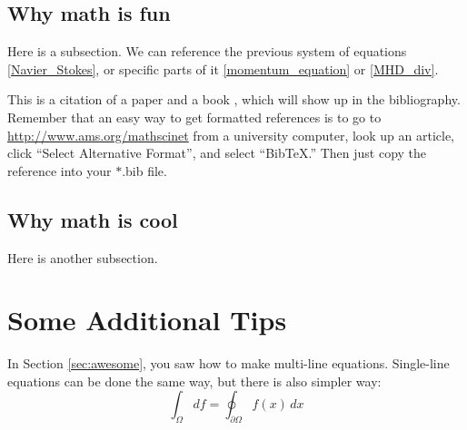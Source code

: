 


\subsection{Why math is fun}\label{subsec:fun}

Here is a subsection.  We can reference the previous system of equations \eqref{Navier_Stokes}, or specific parts of it \eqref{momentum_equation} or \eqref{MHD_div}.  

This is a citation of a paper \cite{Beale_Kato_Majda_1984} and a book \cite{Chandrasekhar_1961}, which will show up in the bibliography.  Remember that an easy way to get formatted references is to go to \url{http://www.ams.org/mathscinet} from a university computer, look up an article, click ``Select Alternative Format'', and select ``BibTeX.''  Then just copy the reference into your $*$.bib file.



\subsection{Why math is cool}\label{subsec:cool}

Here is another subsection.

\section{Some Additional Tips}\label{sec:latex}

In Section \ref{sec:awesome}, you saw how to make multi-line equations.  Single-line equations can be done the same way, but there is also simpler way:
\[
\int_{\Omega}df = \oint_{\partial\Omega}f(x) \, dx
\]



